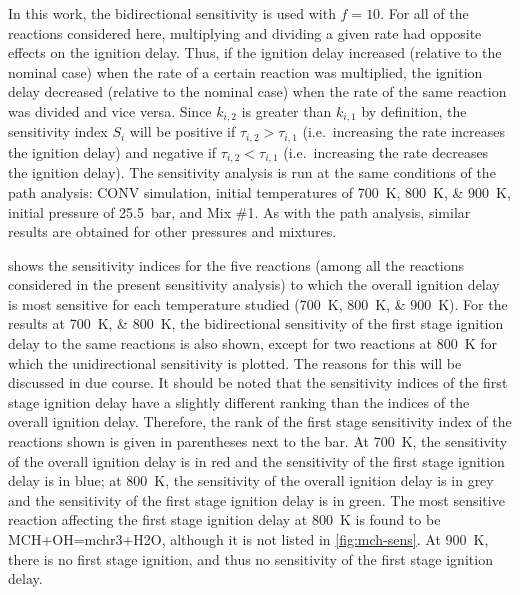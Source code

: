\documentclass[../main.tex]{subfiles}
\begin{document}
In this work, the bidirectional sensitivity is used with $f=10$. For all of the
reactions considered here, multiplying and dividing a given rate had opposite
effects on the ignition delay. Thus, if the ignition delay increased (relative
to the nominal case) when the rate of a certain reaction was multiplied, the
ignition delay decreased (relative to the nominal case) when the rate of the
same reaction was divided and vice versa. Since $k_{i,2}$ is greater than
$k_{i,1}$ by definition, the sensitivity index $S_i$ will be positive if
$\tau_{i,2}>\tau_{i,1}$ (i.e.\ increasing the rate increases the ignition delay)
and negative if $\tau_{i,2}<\tau_{i,1}$ (i.e.\ increasing the rate decreases the
ignition delay). The sensitivity analysis is run at the same conditions of the
path analysis: CONV simulation, initial temperatures of \SIlist{700;800;900}{\kelvin},
initial pressure of \SI{25.5}{\bar}, and Mix \#1. As with the path analysis, similar
results are obtained for other pressures and mixtures.

 shows the sensitivity indices for the five reactions
(among all the reactions considered in the present sensitivity analysis) to
which the overall ignition delay is most sensitive for each temperature studied
(\SIlist{700;800;900}{\kelvin}). For the results at \SIlist{700;800}{\kelvin}, the
bidirectional sensitivity of the first stage ignition delay to the same
reactions is also shown, except for two reactions at \SI{800}{\kelvin} for which the
unidirectional sensitivity is plotted. The reasons for this will be discussed
in due course. It should be noted that the sensitivity indices of the first
stage ignition delay have a slightly different ranking than the indices of the
overall ignition delay. Therefore, the rank of the first stage sensitivity
index of the reactions shown is given in parentheses next to the bar. At \SI{700}{\kelvin},
the sensitivity of the overall ignition delay is in red and the sensitivity of
the first stage ignition delay is in blue; at \SI{800}{\kelvin}, the sensitivity of the
overall ignition delay is in grey and the sensitivity of the first stage
ignition delay is in green. The most sensitive reaction affecting the first
stage ignition delay at \SI{800}{\kelvin} is found to be MCH+OH=mchr3+H2O, although it is
not listed in \cref{fig:mch-sens}. At \SI{900}{\kelvin}, there is no first stage
ignition, and thus no sensitivity of the first stage ignition delay.
\end{document}
